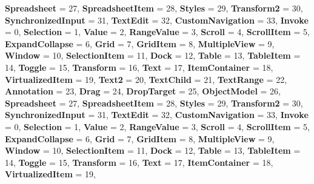 \begin{DoxyCompactItemize}
{\bfseries Spreadsheet} = 27, 
\newline
{\bfseries Spreadsheet\+Item} = 28, 
{\bfseries Styles} = 29, 
{\bfseries Transform2} = 30, 
{\bfseries Synchronized\+Input} = 31, 
\newline
{\bfseries Text\+Edit} = 32, 
{\bfseries Custom\+Navigation} = 33, 
{\bfseries Invoke} = 0, 
{\bfseries Selection} = 1, 
\newline
{\bfseries Value} = 2, 
{\bfseries Range\+Value} = 3, 
{\bfseries Scroll} = 4, 
{\bfseries Scroll\+Item} = 5, 
\newline
{\bfseries Expand\+Collapse} = 6, 
{\bfseries Grid} = 7, 
{\bfseries Grid\+Item} = 8, 
{\bfseries Multiple\+View} = 9, 
\newline
{\bfseries Window} = 10, 
{\bfseries Selection\+Item} = 11, 
{\bfseries Dock} = 12, 
{\bfseries Table} = 13, 
\newline
{\bfseries Table\+Item} = 14, 
{\bfseries Toggle} = 15, 
{\bfseries Transform} = 16, 
{\bfseries Text} = 17, 
\newline
{\bfseries Item\+Container} = 18, 
{\bfseries Virtualized\+Item} = 19, 
{\bfseries Text2} = 20, 
{\bfseries Text\+Child} = 21, 
\newline
{\bfseries Text\+Range} = 22, 
{\bfseries Annotation} = 23, 
{\bfseries Drag} = 24, 
{\bfseries Drop\+Target} = 25, 
\newline
{\bfseries Object\+Model} = 26, 
{\bfseries Spreadsheet} = 27, 
{\bfseries Spreadsheet\+Item} = 28, 
{\bfseries Styles} = 29, 
\newline
{\bfseries Transform2} = 30, 
{\bfseries Synchronized\+Input} = 31, 
{\bfseries Text\+Edit} = 32, 
{\bfseries Custom\+Navigation} = 33, 
\newline
{\bfseries Invoke} = 0, 
{\bfseries Selection} = 1, 
{\bfseries Value} = 2, 
{\bfseries Range\+Value} = 3, 
\newline
{\bfseries Scroll} = 4, 
{\bfseries Scroll\+Item} = 5, 
{\bfseries Expand\+Collapse} = 6, 
{\bfseries Grid} = 7, 
\newline
{\bfseries Grid\+Item} = 8, 
{\bfseries Multiple\+View} = 9, 
{\bfseries Window} = 10, 
{\bfseries Selection\+Item} = 11, 
\newline
{\bfseries Dock} = 12, 
{\bfseries Table} = 13, 
{\bfseries Table\+Item} = 14, 
{\bfseries Toggle} = 15, 
\newline
{\bfseries Transform} = 16, 
{\bfseries Text} = 17, 
{\bfseries Item\+Container} = 18, 
{\bfseries Virtualized\+Item} = 19, 
\newline

\end{DoxyCompactItemize}
